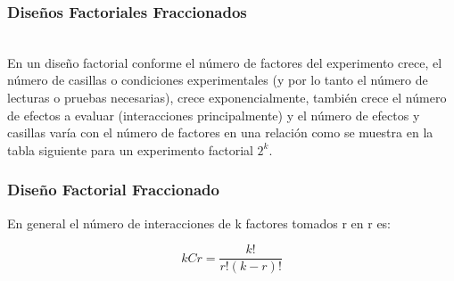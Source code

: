 \documentclass[12pt]{beamer}
\begin{document}
\begin{frame}
\frametitle{Diseños Factoriales Fraccionados}
~\\En un diseño factorial conforme el número de factores del experimento crece, el número de casillas o condiciones experimentales (y por lo tanto el número de lecturas o pruebas necesarias), crece exponencialmente, también crece el número de efectos a evaluar (interacciones principalmente) y el número de efectos y casillas varía con el número de factores en una relación como se muestra en la tabla siguiente para un experimento factorial $2^k$.
\end{frame}

\begin{frame}
\frametitle{Diseño Factorial Fraccionado}
\begin{table}[htbp]
  \centering
  \caption{No de factores del experimento}
  \label{tab:addlabel}%
\end{table}%
En general el número de interacciones de k factores tomados r en r es:

$$kCr=\frac{k!}{r!(k-r)!}$$
\end{frame}
\end{document}
